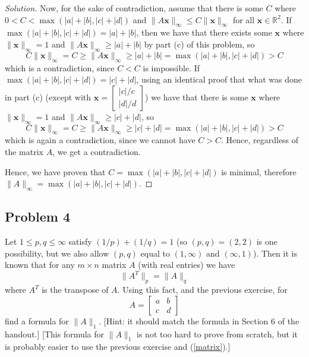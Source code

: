 \documentclass{article}
\newcommand{\R}{{\mathbb R}}
\begin{document}
\begin{enumerate}
\begin{proof}[Solution]
		Now, for the sake of contradiction, assume that there is some $C$ where
		$0 < C < \max(|a| + |b|, |c| + |d|)$
		and $\lVert A\mathbf{x} \rVert_\infty \leq C \lVert \mathbf{x} \rVert_\infty$
		for all $\mathbf{x} \in \R^2$.
		If $\max(|a| + |b|,|c| + |d|) = |a| + |b|$,
		then we have that there exists some $\mathbf{x}$ where
		$\lVert \mathbf{x} \rVert_\infty = 1$ and $\lVert A\mathbf{x} \rVert_\infty \geq |a| + |b|$
		by part (c) of this problem, so
		\[
			C\lVert \mathbf{x} \rVert_\infty
			= C \geq \lVert A\mathbf{x} \rVert_\infty \geq |a| + |b|
			= \max(|a| + |b|, |c| + |d|) > C
		\]
		which is a contradiction, since $C < C$ is impossible.
		If $\max(|a| + |b|, |c| + |d|) = |c| + |d|$,
		using an identical proof that what was done in part (c)
		(except with $\mathbf{x} = \begin{bmatrix} |c|/c \\ |d|/d \end{bmatrix}$)
		we have that there is some $\mathbf{x}$ where $\lVert \mathbf{x} \rVert_\infty = 1$
		and $\lVert A\mathbf{x} \rVert_\infty \geq |c| + |d|$, so
		\[
			C\lVert \mathbf{x} \rVert_\infty
			= C \geq \lVert A\mathbf{x} \rVert_\infty \geq |c| + |d|
			= \max(|a| + |b|, |c| + |d|) > C
		\]
		which is again a contradiction, since we cannot have $C > C$.
		Hence, regardless of the matrix $A$, we get a contradiction.

		Hence, we have proven that $C = \max(|a| + |b|, |c| + |d|)$ is minimal,
		therefore $\lVert A\rVert_\infty = \max(|a| + |b|, |c| + |d|)$.
	\end{proof}
\end{enumerate}


\subsection*{Problem 4}
Let $1 \leq p,q \leq \infty$ satisfy $(1/p) + (1/q) = 1$
(so $(p,q) = (2,2)$ is one possibility, but we also allow $(p,q)$
equal to $(1,\infty)$ and $(\infty,1)$).
Then it is known that for any $m \times n$ matrix $A$ (with real entries) we have
\begin{equation}\label{matrix}
	\lVert A^T \rVert_p = \lVert A \rVert_q
\end{equation}
where $A^T$ is the transpose of $A$.
Using this fact, and the previous exercise, for
\[
	A = \begin{bmatrix} a & b \\ c & d \end{bmatrix}
\]
find a formula for $\lVert A \rVert_1$.
[Hint: it should match the formula in Section 6 of the handout.]
[This formula for $\lVert A \rVert_1$ is not too hard to prove from scratch,
but it is probably easier to use the previous exercise and (\ref{matrix}).]
\end{document}

